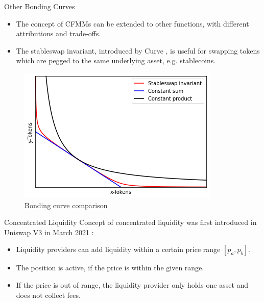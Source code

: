 \documentclass[]{beamer}
\begin{document}
\begin{frame}{Other Bonding Curves}

\begin{small}
\begin{itemize}
	\item The concept of CFMMs can be extended to other functions, with different attributions and trade-offs. 
	\item The stableswap invariant, introduced by Curve \cite{CRV}, is useful for swapping tokens which are pegged to the same underlying asset, e.g. stablecoins.
	\end{itemize}
\end{small}

	\begin{figure}
		\includegraphics[scale=0.6]{../assets/images/bonding-curves.png}
		\caption*{Bonding curve comparison \cite{CRV}}
	\end{figure}
	
\end{frame}


\begin{frame}{Concentrated Liquidity}
	Concept of concentrated liquidity was first introduced in Uniswap V3 in March 2021 \cite{UNIV3}:
	\begin{itemize}
		\item<2-> Liquidity providers can add liquidity within a certain price range $[p_a, p_b]$.
		\item<3-> The position is active, if the price is within the given range. %
		\item<4-> If the price is out of range, the liquidity provider only holds one asset and does not collect fees.
	\end{itemize}
	\vspace{0.5cm}
\end{frame}
\end{document}
